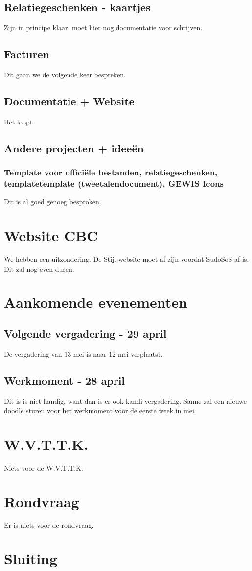 \documentclass[
dutch
]{GEWISMinutes}
\begin{document}
	\subsection{Relatiegeschenken - kaartjes}
	Zijn in principe klaar. \ava moet hier nog documentatie voor schrijven.
	
	\subsection{Facturen}
	Dit gaan we de volgende keer bespreken.
	
	\subsection{Documentatie + Website}
	Het loopt.
	
	\subsection{Andere projecten + idee\"en}
	
	\subsubsection{Template voor officiële bestanden, relatiegeschenken, templatetemplate (tweetalendocument), GEWIS Icons}
	Dit is al goed genoeg besproken.
	
	\section{Website CBC}
	We hebben een uitzondering. De Stijl-website moet af zijn voordat SudoSoS af is. Dit zal nog even duren.
	
	\section{Aankomende evenementen}
	
	\subsection{Volgende vergadering - 29 april}
	De vergadering van 13 mei is naar 12 mei verplaatst.
	
	\subsection{Werkmoment - 28 april}
	Dit is is niet handig, want dan is er ook kandi-vergadering. Sanne zal een nieuwe doodle sturen voor het werkmoment voor de eerste week in mei.
	
	\section{W.V.T.T.K.}
	Niets voor de W.V.T.T.K.
	\section{Rondvraag}
	Er is niets voor de rondvraag.
	
	\section{Sluiting}
	\close{}
	
	\appendix
	\printActionlist
	\printDecisionlist
\end{document}
